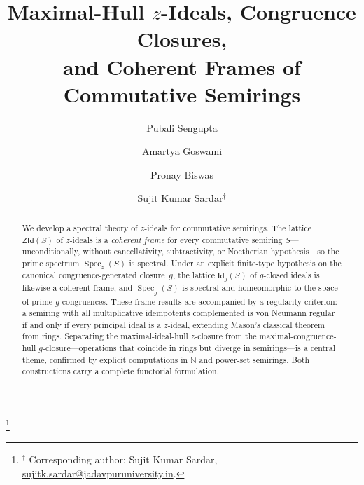 \documentclass[11pt,leqno]{amsart}
\theoremstyle{plain}
\theoremstyle{definition}
\theoremstyle{remark}
\numberwithin{equation}{section}
\DeclareMathOperator{\Spec}{Spec}
\newcommand{\ZId}{\mathsf{ZId}}
\newcommand{\GCl}{\mathsf{Id}_{g}}
\newcommand{\N}{\mathds N}
\begin{document}
\title[Spectral theory of $z$-ideals in semirings]%
{Maximal-Hull $z$-Ideals, Congruence Closures,\\
and Coherent Frames of Commutative Semirings}


\author{Pubali Sengupta}
\address{Department of Mathematics, Jadavpur University,
188 Raja Subodh Chandra Mallick Road, Jadavpur,
Kolkata, West Bengal 700032, India}

\author{Amartya Goswami}
\address{Department of Mathematics and Applied Mathematics,
University of Johannesburg,
P.O.\ Box 524, Auckland Park 2006, South Africa;
National Institute for Theoretical and Computational Sciences
(NITheCS), South Africa}

\author{Pronay Biswas}
\address{Department of Mathematics, Jadavpur University,
188 Raja Subodh Chandra Mallick Road, Jadavpur,
Kolkata, West Bengal 700032, India}


\author{Sujit Kumar Sardar$^\dagger$}
\thanks{$^\dagger$ Corresponding author: Sujit Kumar Sardar, \href{mailto:sujitk.sardar@jadavpuruniversity.in}{sujitk.sardar@jadavpuruniversity.in}.}
\address{Department of Mathematics, Jadavpur University,
188 Raja Subodh Chandra Mallick Road, Jadavpur,
Kolkata, West Bengal 700032, India}




\begin{abstract}
We develop a spectral theory of $z$-ideals for commutative semirings.
The lattice $\ZId(S)$ of $z$-ideals is a \emph{coherent frame} for
every commutative semiring $S$---unconditionally, without
cancellativity, subtractivity, or Noetherian hypothesis---so the
prime spectrum $\Spec_z(S)$ is spectral.
Under an explicit finite-type hypothesis on the canonical
congruence-generated closure~$g$, the lattice $\GCl(S)$ of
$g$-closed ideals is likewise a coherent frame, and $\Spec_g(S)$ is
spectral and homeomorphic to the space of prime $g$-congruences.
These frame results are accompanied by a regularity criterion:
a semiring with all multiplicative idempotents complemented is von
Neumann regular if and only if every principal ideal is a $z$-ideal,
extending Mason's classical theorem from rings.
Separating the maximal-ideal-hull $z$-closure from the
maximal-congruence-hull $g$-closure---operations that coincide in
rings but diverge in semirings---is a central theme, confirmed by
explicit computations in $\N$ and power-set semirings.
Both constructions carry a complete functorial formulation.
\end{abstract}
\end{document}
